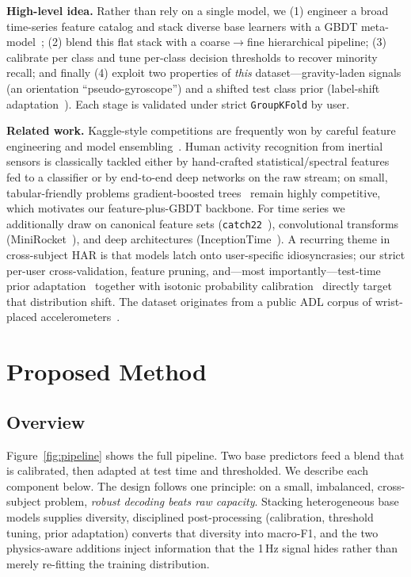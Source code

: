 \documentclass[conference]{IEEEtran}
\begin{document}
\textbf{High-level idea.} Rather than rely on a single model, we (1) engineer a broad time-series feature
catalog and stack diverse base learners with a GBDT meta-model~\cite{ke2017lightgbm}; (2) blend this flat
stack with a coarse$\rightarrow$fine hierarchical pipeline; (3) calibrate per class and tune per-class
decision thresholds to recover minority recall; and finally (4) exploit two properties of \emph{this}
dataset---gravity-laden signals (an orientation ``pseudo-gyroscope'') and a shifted test class prior
(label-shift adaptation~\cite{saerens2002adjusting}). Each stage is validated under strict
\texttt{GroupKFold} by user.

\textbf{Related work.} Kaggle-style competitions are frequently won by careful feature engineering and model
ensembling~\cite{iglovikov2017satellite,kechyn2018sales}. Human activity recognition from inertial sensors is
classically tackled either by hand-crafted statistical/spectral features fed to a classifier or by
end-to-end deep networks on the raw stream; on small, tabular-friendly problems gradient-boosted
trees~\cite{ke2017lightgbm} remain highly competitive, which motivates our feature-plus-GBDT backbone. For
time series we additionally draw on canonical feature sets (\texttt{catch22}~\cite{lubba2019catch22}),
convolutional transforms (MiniRocket~\cite{dempster2021minirocket}), and deep architectures
(InceptionTime~\cite{ismailfawaz2020inceptiontime}). A recurring theme in cross-subject HAR is that models
latch onto user-specific idiosyncrasies; our strict per-user cross-validation, feature pruning, and---most
importantly---test-time prior adaptation~\cite{saerens2002adjusting} together with isotonic probability
calibration~\cite{zadrozny2002transforming} directly target that distribution shift. The dataset originates
from a public ADL corpus of wrist-placed accelerometers~\cite{bruno2014adl}.


\section{Proposed Method}

\subsection{Overview}
Figure~\ref{fig:pipeline} shows the full pipeline. Two base predictors feed a blend that is calibrated, then
adapted at test time and thresholded. We describe each component below. The design follows one principle: on
a small, imbalanced, cross-subject problem, \emph{robust decoding beats raw capacity}. Stacking heterogeneous
base models supplies diversity, disciplined post-processing (calibration, threshold tuning, prior adaptation)
converts that diversity into macro-F1, and the two physics-aware additions inject information that the 1\,Hz
signal hides rather than merely re-fitting the training distribution.
\end{document}

